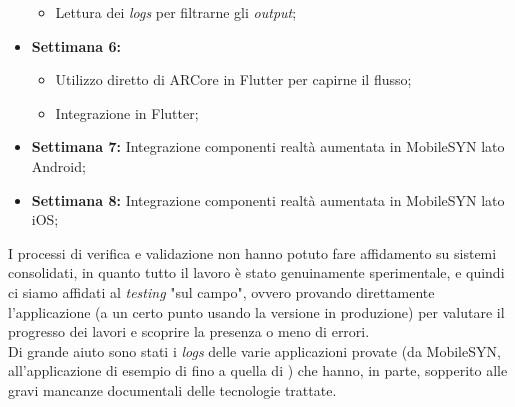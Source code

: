 \begin{itemize}
\begin{itemize}
          \item Lettura dei \textit{logs} per filtrarne gli \textit{output};
      \end{itemize}
  \item \textbf{Settimana 6:} 
      \begin{itemize}
        \item Utilizzo diretto di ARCore in Flutter per capirne il flusso;
        \item Integrazione \asa{} in Flutter;
      \end{itemize}
  \item \textbf{Settimana 7:} Integrazione componenti realtà aumentata in MobileSYN lato Android;
  \item \textbf{Settimana 8:} Integrazione componenti realtà aumentata in MobileSYN lato iOS;
\end{itemize}

I processi di verifica e validazione non hanno potuto fare affidamento su sistemi consolidati, in quanto tutto il lavoro è stato genuinamente sperimentale, e quindi ci siamo affidati al \textit{testing} "sul campo", ovvero provando direttamente l'applicazione (a un certo punto usando la versione in produzione) per valutare il progresso dei lavori e scoprire la presenza o meno di errori.\\
Di grande aiuto sono stati i \textit{logs} delle varie applicazioni provate (da MobileSYN, all'applicazione di esempio di \aplug{} fino a quella di \asa{}) che hanno, in parte, sopperito alle gravi mancanze documentali delle tecnologie trattate.



